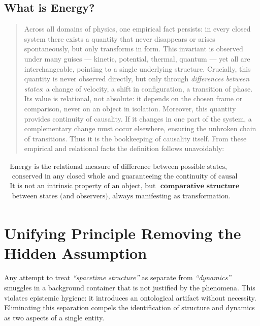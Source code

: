 \documentclass[12pt, a4paper]{article}
\begin{document}
\subsection{What is Energy?}
\begin{quote}
Across all domains of physics, one empirical fact persists: in every closed system there exists a quantity that never disappears or arises spontaneously, but only transforms in form. This invariant is observed under many guises --- kinetic, potential, thermal, quantum --- yet all are interchangeable, pointing to a single underlying structure.
Crucially, this quantity is never observed directly, but only through \textit{differences between states}: a change of velocity, a shift in configuration, a transition of phase. Its value is relational, not absolute: it depends on the chosen frame or comparison, never on an object in isolation.
Moreover, this quantity provides continuity of causality. If it changes in one part of the system, a complementary change must occur elsewhere, ensuring the unbroken chain of transitions. Thus it is the bookkeeping of causality itself.
From these empirical and relational facts the definition follows unavoidably:
\end{quote}
\[
\begin{array}{c} \boxed{ 
\begin{array}{c} 
\text{Energy is the relational measure of difference between possible states,} \\
\text{ conserved in any closed whole and guaranteeing the continuity of causal transitions.} \\ 
\text{It is not an intrinsic property of an object, but }\textbf{ comparative structure}\\ 
\text{ between states (and observers), always manifesting as transformation. }
\end{array} 
} \end{array}
\]


\section{Unifying Principle Removing the Hidden Assumption}

\begin{tcolorbox}[colback=gray!5, colframe=black!80!black, title=Removing the Hidden Assumption]
Any attempt to treat \emph{``spacetime structure''} as separate from \emph{``dynamics''} smuggles in a background container that is not justified by the phenomena. This violates epistemic hygiene: it introduces an ontological artifact without necessity. Eliminating this separation compels the identification of structure and dynamics as two aspects of a single entity.
\end{tcolorbox}
\end{document}
